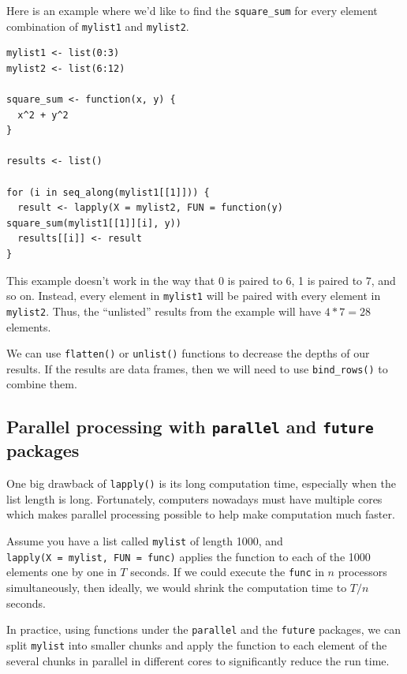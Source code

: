 \documentclass[
]{book}
\begin{document}
Here is an example where we'd like to find the \texttt{square\_sum} for every element combination of \texttt{mylist1} and \texttt{mylist2}.

\begin{verbatim}
mylist1 <- list(0:3)
mylist2 <- list(6:12)

square_sum <- function(x, y) {
  x^2 + y^2
}

results <- list()

for (i in seq_along(mylist1[[1]])) {
  result <- lapply(X = mylist2, FUN = function(y) square_sum(mylist1[[1]][i], y))
  results[[i]] <- result
}
\end{verbatim}

This example doesn't work in the way that 0 is paired to 6, 1 is paired to 7, and so on. Instead, every element in \texttt{mylist1} will be paired with every element in \texttt{mylist2}. Thus, the ``unlisted'' results from the example will have \(4*7 = 28\) elements.

We can use \texttt{flatten()} or \texttt{unlist()} functions to decrease the depths of our results. If the results are data frames, then we will need to use \texttt{bind\_rows()} to combine them.

\subsection{\texorpdfstring{Parallel processing with \texttt{parallel} and \texttt{future} packages}{Parallel processing with parallel and future packages}}\label{parallel-processing-with-parallel-and-future-packages}

One big drawback of \texttt{lapply()} is its long computation time, especially when the list length is long. Fortunately, computers nowadays must have multiple cores which makes parallel processing possible to help make computation much faster.

Assume you have a list called \texttt{mylist} of length 1000, and \texttt{lapply(X\ =\ mylist,\ FUN\ =\ func)} applies the function to each of the 1000 elements one by one in \(T\) seconds. If we could execute the \texttt{func} in \(n\) processors simultaneously, then ideally, we would shrink the computation time to \(T/n\) seconds.

In practice, using functions under the \texttt{parallel} and the \texttt{future} packages, we can split \texttt{mylist} into smaller chunks and apply the function to each element of the several chunks in parallel in different cores to significantly reduce the run time.
\end{document}
